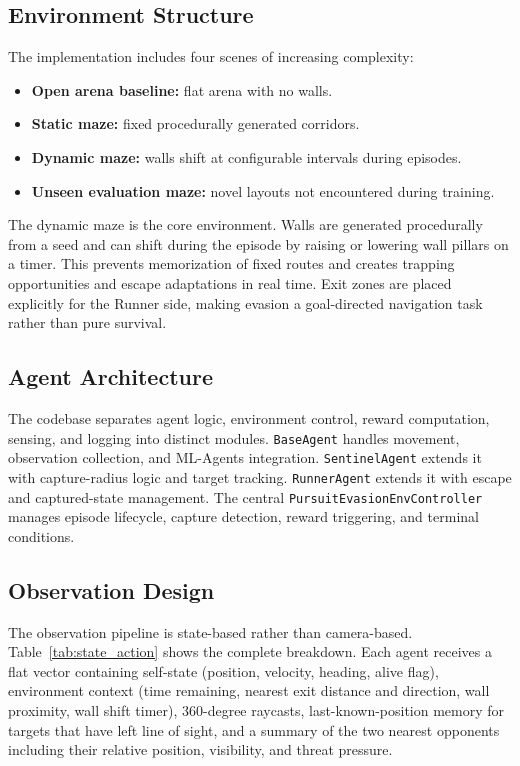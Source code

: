 \documentclass[conference]{IEEEtran}
\begin{document}
\subsection{Environment Structure}

The implementation includes four scenes of increasing complexity:
\begin{itemize}
    \item \textbf{Open arena baseline:} flat arena with no walls.
    \item \textbf{Static maze:} fixed procedurally generated corridors.
    \item \textbf{Dynamic maze:} walls shift at configurable intervals during episodes.
    \item \textbf{Unseen evaluation maze:} novel layouts not encountered during training.
\end{itemize}

The dynamic maze is the core environment. Walls are generated procedurally from a seed and can shift during the episode by raising or lowering wall pillars on a timer. This prevents memorization of fixed routes and creates trapping opportunities and escape adaptations in real time. Exit zones are placed explicitly for the Runner side, making evasion a goal-directed navigation task rather than pure survival.

\subsection{Agent Architecture}

The codebase separates agent logic, environment control, reward computation, sensing, and logging into distinct modules. \texttt{BaseAgent} handles movement, observation collection, and ML-Agents integration. \texttt{SentinelAgent} extends it with capture-radius logic and target tracking. \texttt{RunnerAgent} extends it with escape and captured-state management. The central \texttt{PursuitEvasionEnvController} manages episode lifecycle, capture detection, reward triggering, and terminal conditions.

\subsection{Observation Design}

The observation pipeline is state-based rather than camera-based. Table~\ref{tab:state_action} shows the complete breakdown. Each agent receives a flat vector containing self-state (position, velocity, heading, alive flag), environment context (time remaining, nearest exit distance and direction, wall proximity, wall shift timer), 360-degree raycasts, last-known-position memory for targets that have left line of sight, and a summary of the two nearest opponents including their relative position, visibility, and threat pressure.
\end{document}
